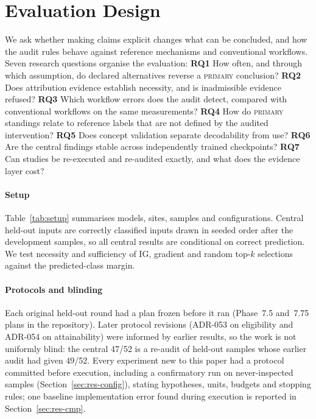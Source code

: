 \section{Evaluation Design}
\label{sec:design}

We ask whether making claims explicit changes what can be concluded, and how the audit rules behave against reference mechanisms and conventional workflows. Seven research questions organise the evaluation:
\textbf{RQ1} How often, and through which assumption, do declared alternatives reverse a \textsc{primary} conclusion?
\textbf{RQ2} Does attribution evidence establish necessity, and is inadmissible evidence refused?
\textbf{RQ3} Which workflow errors does the audit detect, compared with conventional workflows on the same measurements?
\textbf{RQ4} How do \textsc{primary} standings relate to reference labels that are not defined by the audited intervention?
\textbf{RQ5} Does concept validation separate decodability from use?
\textbf{RQ6} Are the central findings stable across independently trained checkpoints?
\textbf{RQ7} Can studies be re-executed and re-audited exactly, and what does the evidence layer cost?

\paragraph*{Setup}
Table~\ref{tab:setup} summarises models, sites, samples and configurations. Central held-out inputs are correctly classified inputs drawn in seeded order after the development samples, so all central results are conditional on correct prediction. We test necessity and sufficiency of IG, gradient and random top-$k$ selections against the predicted-class margin.

\paragraph*{Protocols and blinding}
Each original held-out round had a plan frozen before it ran (Phase~7.5 and~7.75 plans in the repository). Later protocol revisions (ADR-053 on eligibility and ADR-054 on attainability) were informed by earlier results, so the work is not uniformly blind: the central 47/52 is a re-audit of held-out samples whose earlier audit had given 49/52. Every experiment new to this paper had a protocol committed before execution, including a confirmatory run on never-inspected samples (Section~\ref{sec:res-config}), stating hypotheses, units, budgets and stopping rules; one baseline implementation error found during execution is reported in Section~\ref{sec:res-cmp}.

